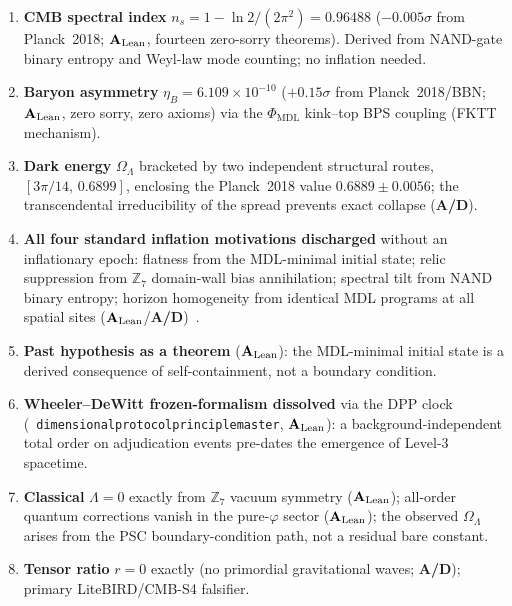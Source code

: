 \documentclass[11pt]{article}
\newcommand{\PHIMDL}{\ensuremath{\Phi_{\mathrm{MDL}}}}
\newcommand{\ZS}{\ensuremath{\mathbb{Z}_7}}
\newcommand{\lean}[1]{%
  \penalty-100
  \begingroup\def\_{\textunderscore\allowbreak}\texttt{#1}\endgroup}
\newcommand{\CatAL}{\ensuremath{\textbf{A}_{\rm Lean}}}
\newcommand{\CatAD}{\textbf{A/D}}
\begin{document}
\begin{tcolorbox}[colback=blue!3,colframe=blue!45,
  title={Cosmological closures: what no other theory derives (\CatAL/\CatAD; P47)},
  breakable=false]
\small\renewcommand{\arraystretch}{1.15}
\begin{enumerate}[leftmargin=1.6em,itemsep=2pt]
\item \textbf{CMB spectral index} $n_s = 1 - \ln2/(2\pi^2) = 0.96488$
  ($-0.005\sigma$ from Planck~2018; \CatAL, fourteen zero-sorry theorems). Derived
  from NAND-gate binary entropy and Weyl-law mode counting; no inflation needed.
\item \textbf{Baryon asymmetry} $\eta_B = 6.109\times10^{-10}$
  ($+0.15\sigma$ from Planck~2018/BBN; \CatAL, zero sorry, zero axioms) via the
  $\PHIMDL$ kink--top BPS coupling (FKTT mechanism).
\item \textbf{Dark energy} $\Omega_\Lambda$ bracketed by two independent structural
  routes, $[3\pi/14,\,0.6899]$, enclosing the Planck~2018 value $0.6889\pm0.0056$;
  the transcendental irreducibility of the spread prevents exact collapse (\CatAD).
\item \textbf{All four standard inflation motivations discharged} without an
  inflationary epoch: flatness from the MDL-minimal initial state; relic suppression
  from $\ZS$ domain-wall bias annihilation; spectral tilt from NAND binary entropy;
  horizon homogeneity from identical MDL programs at all spatial sites
  (\CatAL/\CatAD)~\cite{SpivackGTECosmology}.
\item \textbf{Past hypothesis as a theorem} (\CatAL): the MDL-minimal initial state
  is a derived consequence of self-containment, not a boundary condition.
\item \textbf{Wheeler--DeWitt frozen-formalism dissolved} via the DPP clock
  \mbox{(\lean{dimensional\_protocol\_principle\_master}}, \CatAL): a
  background-independent total order on adjudication events pre-dates the emergence
  of Level-3 spacetime.
\item \textbf{Classical} $\Lambda = 0$ exactly from $\ZS$ vacuum symmetry
  (\CatAL); all-order quantum corrections vanish in the pure-$\varphi$ sector
  (\CatAL); the observed $\Omega_\Lambda$ arises from the PSC boundary-condition
  path, not a residual bare constant.
\item \textbf{Tensor ratio} $r = 0$ exactly (no primordial gravitational waves;
  \CatAD); primary LiteBIRD/CMB-S4 falsifier.
\end{enumerate}
\end{tcolorbox}
\end{document}

